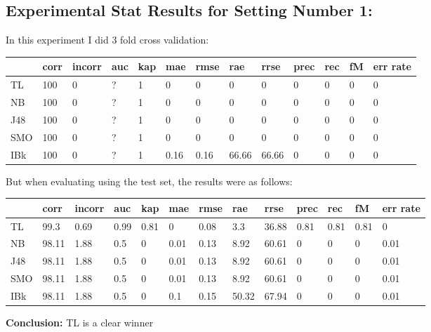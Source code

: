 \documentclass[a4paper,12pt, english]{article}
\begin{document}
\subsection{Experimental Stat Results for Setting Number 1:}
In this experiment I did 3 fold cross validation:
\begin{small}
\begin{center}
    \begin{tabular}{ | l | l | l | l | l | l | l | l | l | l | l | l | l |}
    \hline
      	& corr & incorr  & auc & kap & mae & rmse & rae & rrse & prec & rec & fM & err rate\\ \hline
      	TL & 100 & 0 & ? & 1 & 0 & 0 & 0 & 0 & 0 & 0 & 0 & 0\\ \hline
	NB & 100 & 0 & ? & 1 & 0 & 0 & 0 & 0 & 0 & 0 & 0 & 0\\ \hline
	J48 & 100 & 0 & ? & 1 & 0 & 0 & 0 & 0 & 0 & 0 & 0 & 0\\ \hline
	SMO & 100 & 0 & ? & 1 & 0 & 0 & 0 & 0 & 0 & 0 & 0 & 0\\ \hline
	IBk & 100 & 0 & ? & 1 & 0.16 & 0.16 & 66.66 & 66.66 & 0 & 0 & 0 & 0\\ \hline  
    \end{tabular}       
\end{center}
\end{small}

But when evaluating using the test set, the results were as follows:
\begin{small}
\begin{center}
    \begin{tabular}{ | l | l | l | l | l | l | l | l | l | l | l | l | l |}
    \hline
      	& corr & incorr  & auc & kap & mae & rmse & rae & rrse & prec & rec & fM & err rate\\ \hline
      	TL & 99.3 & 0.69 & 0.99 & 0.81 & 0 & 0.08 & 3.3 & 36.88 & 0.81 & 0.81 & 0.81 & 0\\ \hline
	NB & 98.11 & 1.88 & 0.5 & 0 & 0.01 & 0.13 & 8.92 & 60.61 & 0 & 0 & 0 & 0.01\\ \hline
	J48 & 98.11 & 1.88 & 0.5 & 0 & 0.01 & 0.13 & 8.92 & 60.61 & 0 & 0 & 0 & 0.01\\ \hline
	SMO & 98.11 & 1.88 & 0.5 & 0 & 0.01 & 0.13 & 8.92 & 60.61 & 0 & 0 & 0 & 0.01\\ \hline
	IBk & 98.11 & 1.88 & 0.5 & 0 & 0.1 & 0.15 & 50.32 & 67.94 & 0 & 0 & 0 & 0.01\\ \hline  
    \end{tabular}       
\end{center}
\end{small}
\textbf{Conclusion:} TL is a clear winner
\end{document}
